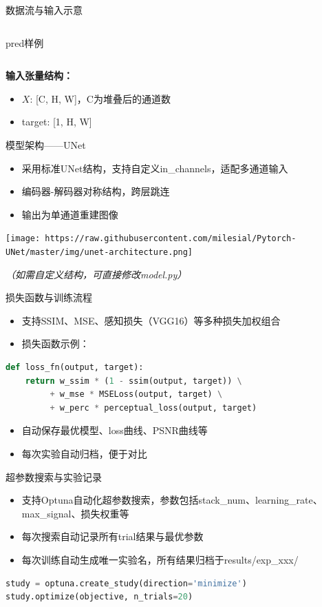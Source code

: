 \documentclass{beamer}
\begin{document}
\begin{frame}{数据流与输入示意}
\begin{columns}
\centerline{\small pred样例}
\end{columns}
\vspace{0.5em}
\textbf{输入张量结构：}
\begin{itemize}
    \item $X$: [C, H, W]，C为堆叠后的通道数
    \item target: [1, H, W]
\end{itemize}
\end{frame}

\begin{frame}{模型架构——UNet}
\begin{itemize}
    \item 采用标准UNet结构，支持自定义in\_channels，适配多通道输入
    \item 编码器-解码器对称结构，跨层跳连
    \item 输出为单通道重建图像
\end{itemize}
\begin{center}
\texttt{[image: https://raw.githubusercontent.com/milesial/Pytorch-UNet/master/img/unet-architecture.png]}
\end{center}
\textit{（如需自定义结构，可直接修改model.py）}
\end{frame}

\begin{frame}{损失函数与训练流程}
\begin{itemize}
    \item 支持SSIM、MSE、感知损失（VGG16）等多种损失加权组合
    \item 损失函数示例：
\end{itemize}
\begin{lstlisting}[language=Python]
def loss_fn(output, target):
    return w_ssim * (1 - ssim(output, target)) \
         + w_mse * MSELoss(output, target) \
         + w_perc * perceptual_loss(output, target)
\end{lstlisting}
\begin{itemize}
    \item 自动保存最优模型、loss曲线、PSNR曲线等
    \item 每次实验自动归档，便于对比
\end{itemize}
\end{frame}

\begin{frame}{超参数搜索与实验记录}
\begin{itemize}
    \item 支持Optuna自动化超参数搜索，参数包括stack\_num、learning\_rate、max\_signal、损失权重等
    \item 每次搜索自动记录所有trial结果与最优参数
    \item 每次训练自动生成唯一实验名，所有结果归档于results/exp\_xxx/
\end{itemize}
\begin{lstlisting}[language=Python]
study = optuna.create_study(direction='minimize')
study.optimize(objective, n_trials=20)
\end{lstlisting}
\end{frame}
\end{document}
